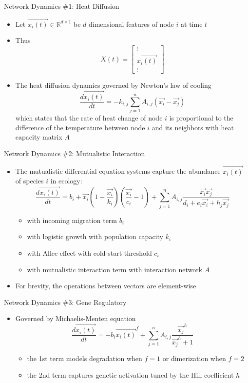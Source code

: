 \documentclass{beamer}
\begin{document}
\begin{frame}{Network Dynamics \#1: Heat Diffusion}
\begin{itemize}
\item Let $\overrightarrow{x_i(t)}\in\mathbb{R}^{d\times1}$ be $d$ dimensional features of node $i$ at time $t$
\item Thus\[
X(t)=\begin{bmatrix}\vdots\\\overrightarrow{x_i(t)}\\\vdots\end{bmatrix}
\]
\item The heat diffusion dynamics governed by Newton's law of cooling\[
\frac{d\overrightarrow{x_i(t)}}{dt}=-k_{i,j}\sum_{j=1}^nA_{i,j}(\overrightarrow{x_i}-\overrightarrow{x_j})
\]which states that the rate of heat change of node $i$ is proportional to the difference of the temperature between node $i$ and its neighbors with heat capacity matrix $A$
\end{itemize}
\end{frame}

\begin{frame}{Network Dynamics \#2: Mutualistic Interaction}
\begin{itemize}
\item The mutualistic differential equation systems capture the abundance $\overrightarrow{x_i(t)}$ of species $i$ in ecology:\[
\frac{d\overrightarrow{x_i(t)}}{dt}=b_i+\overrightarrow{x_i}\left(1-\frac{\overrightarrow{x_i}}{k_i}\right)\left(\frac{\overrightarrow{x_i}}{c_i}-1\right)+\sum_{j=1}^nA_{i,j}\frac{\overrightarrow{x_i}\overrightarrow{x_j}}{d_i+e_i\overrightarrow{x_i}+h_j\overrightarrow{x_j}}
\]
\begin{itemize}
\item with incoming migration term $b_i$
\item with logistic growth with population capacity $k_i$
\item with Allee effect with cold-start threshold $c_i$
\item with mutualistic interaction term with interaction network $A$
\end{itemize}
\item For brevity, the operations between vectors are element-wise
\end{itemize}
\end{frame}

\begin{frame}{Network Dynamics \#3: Gene Regulatory}
\begin{itemize}
\item Governed by Michaelis-Menten equation\[
\frac{d\overrightarrow{x_i(t)}}{dt}=-b_i\overrightarrow{x_i(t)}^f+\sum_{j=1}^nA_{i,j}\frac{\overrightarrow{x_j}^h}{\overrightarrow{x_j}^h+1}
\]
\begin{itemize}
\item the 1st term models degradation when $f=1$ or dimerization when $f=2$
\item the 2nd term captures genetic activation tuned by the Hill coefficient $h$
\end{itemize}
\end{itemize}
\end{frame}
\end{document}
